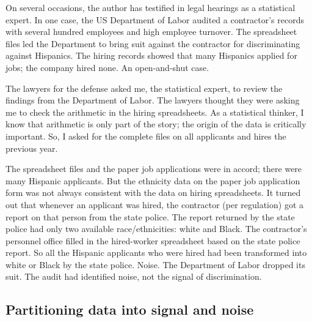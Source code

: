 \documentclass[
  letterpaper,
  DIV=11,
  numbers=noendperiod,
  oneside]{scrartcl}
\begin{document}
\begin{tcolorbox}[enhanced jigsaw, colbacktitle=quarto-callout-note-color!10!white, opacityback=0, breakable, opacitybacktitle=0.6, colback=white, coltitle=black, arc=.35mm, title=\textcolor{quarto-callout-note-color}{\faInfo}\hspace{0.5em}{Noise in hiring}, left=2mm, colframe=quarto-callout-note-color-frame, rightrule=.15mm, bottomrule=.15mm, leftrule=.75mm, bottomtitle=1mm, toptitle=1mm, titlerule=0mm, toprule=.15mm]

On several occasions, the author has testified in legal hearings as a
statistical expert. In one case, the US Department of Labor audited a
contractor's records with several hundred employees and high employee
turnover. The spreadsheet files led the Department to bring suit against
the contractor for discriminating against Hispanics. The hiring records
showed that many Hispanics applied for jobs; the company hired none. An
open-and-shut case.

The lawyers for the defense asked me, the statistical expert, to review
the findings from the Department of Labor. The lawyers thought they were
asking me to check the arithmetic in the hiring spreadsheets. As a
statistical thinker, I know that arithmetic is only part of the story;
the origin of the data is critically important. So, I asked for the
complete files on all applicants and hires the previous year.

The spreadsheet files and the paper job applications were in accord;
there were many Hispanic applicants. But the ethnicity data on the paper
job application form was not always consistent with the data on hiring
spreadsheets. It turned out that whenever an applicant was hired, the
contractor (per regulation) got a report on that person from the state
police. The report returned by the state police had only two available
race/ethnicities: white and Black. The contractor's personnel office
filled in the hired-worker spreadsheet based on the state police report.
So all the Hispanic applicants who were hired had been transformed into
white or Black by the state police. Noise. The Department of Labor
dropped its suit. The audit had identified noise, not the signal of
discrimination.

\end{tcolorbox}

\subsection{Partitioning data into signal and
noise}\label{partitioning-data-into-signal-and-noise}
\end{document}
